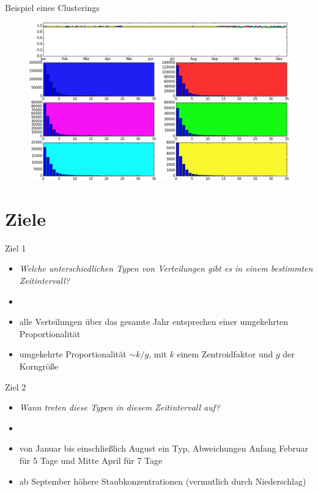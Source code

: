 \documentclass{beamer}
\begin{document}
    \begin{frame}{Beispiel eines Clusterings}
    	\begin{figure}
    		\centering\includegraphics[width=\textwidth]{histogramm.png}
    	\end{figure}
    \end{frame}
    
    
    \section{Ziele}
    \begin{frame}{Ziel 1}
    	\begin{itemize}
    		\setlength\itemsep{1em}
    		\item[] \textit{Welche unterschiedlichen Typen von Verteilungen gibt es in einem bestimmten Zeitintervall?}
    		\item[]
    		\item alle Verteilungen über das gesamte Jahr entsprechen einer umgekehrten Proportionalität
    		\item umgekehrte Proportionalität $\sim k/g$, mit $k$ einem Zentroidfaktor und $g$ der Korngröße
    	\end{itemize}
    \end{frame}
    
    \begin{frame}{Ziel 2}
    	\begin{itemize}
    		\setlength\itemsep{1em}
    		\item[] \textit{Wann treten diese Typen in diesem Zeitintervall auf?}
    		\item[]
    		\item von Januar bis einschließlich August ein Typ, Abweichungen Anfang Februar für 5 Tage und Mitte April für 7 Tage
    		\item ab September höhere Staubkonzentrationen (vermutlich durch Niederschlag)
    	\end{itemize}
    \end{frame}
    
\end{document}
